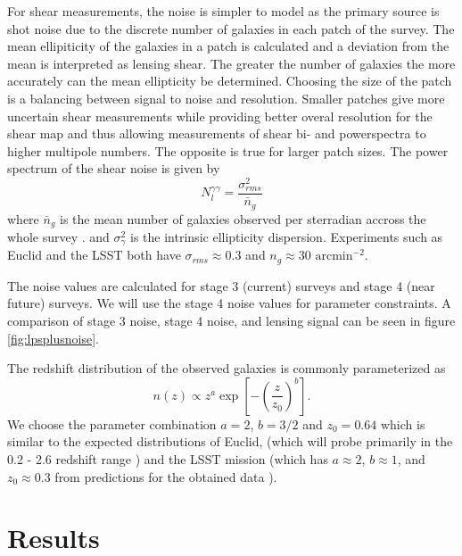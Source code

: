 \documentclass[11pt]{article} %
\newcommand{\br}[1]{\ensuremath{\left( #1 \right)}}
\newcommand{\sbr}[1]{\ensuremath{\left[ #1 \right]}}
\begin{document}
For shear measurements, the noise is simpler to model as the primary source is shot noise due to the discrete number of galaxies in each patch of the survey. The mean ellipiticity of the galaxies in a patch is calculated and a deviation from the mean is interpreted as lensing shear. The greater the number of galaxies the more accurately can the mean ellipticity be determined. Choosing the size of the patch is a balancing between signal to noise and resolution. Smaller patches give more uncertain shear measurements while providing better overal resolution for the shear map and thus allowing measurements of shear bi- and powerspectra to higher multipole numbers. The opposite is true for larger patch sizes. The power spectrum of the shear noise is given by
\begin{equation*}
    N^{\gamma\gamma}_{l} = \frac{\sigma^2_{rms}}{\bar n_g}
\end{equation*}
where $\bar n_g$ is the mean number of galaxies observed per sterradian accross the whole survey \cite{weaklensingnotes2020}.
and $\sigma^2_\gamma$ is the intrinsic ellipticity dispersion. 
Experiments such as Euclid and the LSST both have $\sigma_{rms} \approx 0.3$ \cite{euclid1overview} \cite{lsstsciencebook} and 
$ n_g\approx 30 \text{ arcmin}^{-2}$.

The noise values are calculated for stage 3 (current) surveys and stage 4 (near future) surveys. We will use the stage 4 noise values for parameter constraints. A comparison of stage 3 noise, stage 4 noise, and lensing signal can be seen in figure \ref{fig:lpsplusnoise}.

The redshift distribution of the observed galaxies is commonly parameterized as \cite{bartelmann2001weak}
\begin{equation*}
    n(z) \propto z^a \exp\sbr{-\br{\frac{z}{z_0}}^b}.
\end{equation*}
We choose the parameter combination $a = 2$, $b = 3/2$ and $z_0 = 0.64$ which is similar to the expected distributions of Euclid, (which will probe primarily in the 0.2 - 2.6 redshift range \cite{euclidprep10})
and the LSST mission (which has $a \approx 2$, $b \approx 1$, and $z_0 \approx 0.3$ from predictions for the obtained data \cite{lsstsciencebookchapter3}).

\section{Results}\label{sec:results}
\end{document}
